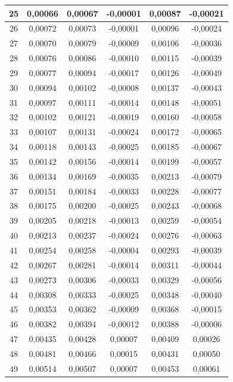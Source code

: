 \documentclass[12pt]{mwbk}
\theoremstyle{plain}
\theoremstyle{definition}
\theoremstyle{remark}
\begin{document}
\begin{center}
\begin{longtable}{|c|c|c|c|c|c|}
25 & 0,00066 & 0,00067 & -0,00001 & 0,00087 & -0,00021 \\ \hline
26 & 0,00072 & 0,00073 & -0,00001 & 0,00096 & -0,00024 \\ \hline
27 & 0,00070 & 0,00079 & -0,00009 & 0,00106 & -0,00036 \\ \hline
28 & 0,00076 & 0,00086 & -0,00010 & 0,00115 & -0,00039 \\ \hline
29 & 0,00077 & 0,00094 & -0,00017 & 0,00126 & -0,00049 \\ \hline
30 & 0,00094 & 0,00102 & -0,00008 & 0,00137 & -0,00043 \\ \hline
31 & 0,00097 & 0,00111 & -0,00014 & 0,00148 & -0,00051 \\ \hline
32 & 0,00102 & 0,00121 & -0,00019 & 0,00160 & -0,00058 \\ \hline
33 & 0,00107 & 0,00131 & -0,00024 & 0,00172 & -0,00065 \\ \hline
34 & 0,00118 & 0,00143 & -0,00025 & 0,00185 & -0,00067 \\ \hline
35 & 0,00142 & 0,00156 & -0,00014 & 0,00199 & -0,00057 \\ \hline
36 & 0,00134 & 0,00169 & -0,00035 & 0,00213 & -0,00079 \\ \hline
37 & 0,00151 & 0,00184 & -0,00033 & 0,00228 & -0,00077 \\ \hline
38 & 0,00175 & 0,00200 & -0,00025 & 0,00243 & -0,00068 \\ \hline
39 & 0,00205 & 0,00218 & -0,00013 & 0,00259 & -0,00054 \\ \hline
40 & 0,00213 & 0,00237 & -0,00024 & 0,00276 & -0,00063 \\ \hline
41 & 0,00254 & 0,00258 & -0,00004 & 0,00293 & -0,00039 \\ \hline
42 & 0,00267 & 0,00281 & -0,00014 & 0,00311 & -0,00044 \\ \hline
43 & 0,00273 & 0,00306 & -0,00033 & 0,00329 & -0,00056 \\ \hline
44 & 0,00308 & 0,00333 & -0,00025 & 0,00348 & -0,00040 \\ \hline
45 & 0,00353 & 0,00362 & -0,00009 & 0,00368 & -0,00015 \\ \hline
46 & 0,00382 & 0,00394 & -0,00012 & 0,00388 & -0,00006 \\ \hline
47 & 0,00435 & 0,00428 & 0,00007  & 0,00409 &  0,00026 \\ \hline
48 & 0,00481 & 0,00466 & 0,00015  & 0,00431 &  0,00050 \\ \hline
49 & 0,00514 & 0,00507 & 0,00007  & 0,00453 &  0,00061 \\ \hline

\end{longtable}
\end{center}
\end{document}
